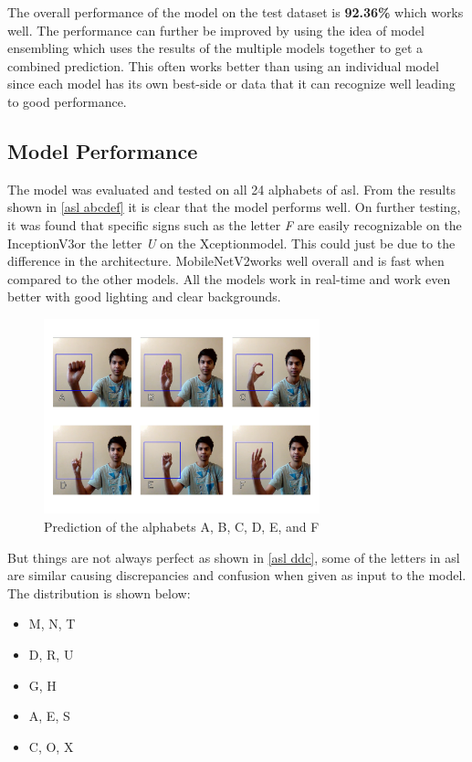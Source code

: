 \documentclass[twocolumn]{article}
\newcommand{\mobilenet}{MobileNetV2}
\newcommand{\xception}{Xception}
\newcommand{\inception}{InceptionV3}
\begin{document}
The overall performance of the model on the test dataset is \textbf{92.36\%} 
which works well. The performance can further be improved by using the idea of 
model ensembling which uses the results of the multiple models together to get 
a combined prediction. This often works better than using an individual model 
since each model has its own best-side or data that it can recognize well 
leading to good performance.

\subsection{Model Performance}

The model was evaluated and tested on all 24 alphabets of \gls{asl}. From the 
results shown in \autoref{asl abcdef} it is clear that the model performs 
well. On further testing, it was found that specific signs such as the letter 
\textit{F} are easily recognizable on the \inception or the letter \textit{U} 
on the \xception model. This could just be due to the difference in the 
architecture. \mobilenet works well overall and is fast when compared to the 
other models. All the models work in real-time and work even better with good 
lighting and clear backgrounds.

\begin{figure}[h]
\centering
\includegraphics[width=8cm]{./figures/asl abcdef}
\caption{Prediction of the alphabets A, B, C, D, E, and F}
\label{asl abcdef}
\end{figure}

But things are not always perfect as shown in \autoref{asl ddc}, some of the 
letters in \gls{asl} are similar causing discrepancies and confusion when 
given as input to the model. The distribution is shown below:
\begin{itemize}
	\item M, N, T
	\item D, R, U
	\item G, H
	\item A, E, S
	\item C, O, X
\end{itemize}
\end{document}
